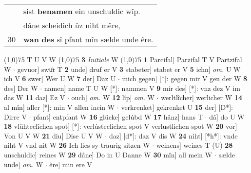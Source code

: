 \documentclass[8pt,a4paper,notitlepage]{article}
\begin{document}
\begin{table}[ht]
\begin{minipage}[t]{0.5\linewidth}
\begin{tabular}{rl}
 & sist \textbf{benamen} ein unschuldic wîp.\\ 
 & dâne scheidich ûz niht mêre,\\ 
30 & \textbf{wan} \textbf{des} sî pfant mîn sælde unde êre.\\ 
\end{tabular}
\scriptsize
\line(1,0){75} \newline
T U V W \newline
\line(1,0){75} \newline
\textbf{3} \textit{Initiale} W  \newline
\line(1,0){75} \newline
\textbf{1} Parcifal] Parzifal T V Partzifal W  $\cdot$ gevuor] swuͦr T \textbf{2} unde] druf er V \textbf{3} stabeter] stabet er V \textbf{5} ichn] \textit{om.} U W ich V \textbf{6} swer] Wer U W \textbf{7} der] Daz U  $\cdot$ mich gegen] [*]: gegen mir V gen der W \textbf{8} des] Der W  $\cdot$ namen] name T U W [*]: nammen V \textbf{9} mir des] [*]: vnz dez V im das W \textbf{11} daz] Ez V  $\cdot$ ouch] \textit{om.} W \textbf{12} lîp] \textit{om.} W  $\cdot$ werltlîcher] werlicher W \textbf{14} al mîn] aller [*]: min V allen inein W  $\cdot$ verkrenket] gekrenket U \textbf{15} der] [D*]: Dirre V  $\cdot$ pfant] entpfant W \textbf{16} glücke] gelúbd W \textbf{17} hânz] hans T  $\cdot$ dâ] do U W \textbf{18} vlühteclîchen spot] [*]: verlústeclichen spot V verlustlichen spot W \textbf{20} vor] Von U V W \textbf{21} diu] Dise U V W  $\cdot$ daz] [d*]: daz V dis W \textbf{24} niht] [*h*]: vnde niht V vnd nit W \textbf{26} Ich lies sy traurig sitzen W  $\cdot$ weinens] weines T (U) \textbf{28} unschuldic] reines W \textbf{29} dâne] Do in U Danne W \textbf{30} mîn] all mein W  $\cdot$ sælde unde] \textit{om.} W  $\cdot$ êre] min ere V \newline
\end{minipage}
\end{table}
\end{document}
